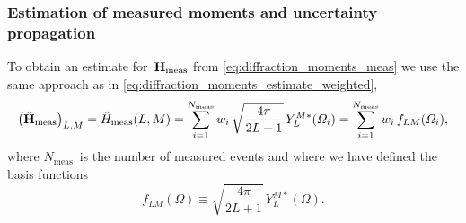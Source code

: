 \subsubsection{Estimation of measured moments and uncertainty propagation}%
\label{sec:diffraction:estimation_uncert}

To obtain an estimate for~$\bm{\mathrm{H}}_\text{meas}$ from
\cref{eq:diffraction_moments_meas} we use the same approach as in
\cref{eq:diffraction_moments_estimate_weighted}, \ie
\begin{equation}
  \label{eq:diffraction_moments_meas_estimate_weighted}
  \rBrk[1]{\hat{\vect{H}}_\text{meas}}_{L, M}
  = \hat{H}_\text{meas}(L, M)
  = \sum_{i = 1}^{N_\text{meas}} w_i\, \sqrt{\frac{4 \pi}{2 L + 1}}\, Y_L^{M *}(\Omega_i)
  = \sum_{i = 1}^{N_\text{meas}} w_i\, f_{L M}(\Omega_i),
\end{equation}
where $N_\text{meas}$~is the number of measured events and where we
have defined the basis functions
\begin{equation}
  \label{eq:diffraction_basis_fcn}
  f_{L M}(\Omega)
  \equiv \sqrt{\frac{4 \pi}{2 L + 1}}\, Y_L^{M *}(\Omega).
\end{equation}


